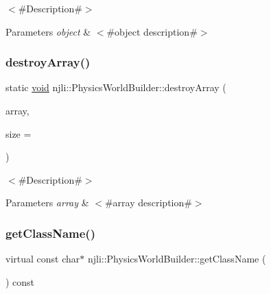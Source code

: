 $<$\#\+Description\#$>$


\begin{DoxyParams}{Parameters}
{\em object} & $<$\#object description\#$>$ \\
\hline
\end{DoxyParams}
\mbox{\label{classnjli_1_1_physics_world_builder_a96ea933d2e5c36b92152c0489f3a707e}} 
\subsubsection{\texorpdfstring{destroy\+Array()}{destroyArray()}}
{\footnotesize\ttfamily static \mbox{\hyperlink{_thread_8h_af1e856da2e658414cb2456cb6f7ebc66}{void}} njli\+::\+Physics\+World\+Builder\+::destroy\+Array (\begin{DoxyParamCaption}\item[{\mbox{\hyperlink{classnjli_1_1_physics_world_builder}{Physics\+World\+Builder}} $\ast$$\ast$}]{array,  }\item[{const \mbox{\hyperlink{_util_8h_a10e94b422ef0c20dcdec20d31a1f5049}{u32}}}]{size = {} }\end{DoxyParamCaption})\hspace{0.3cm}{\ttfamily [static]}}

$<$\#\+Description\#$>$


\begin{DoxyParams}{Parameters}
{\em array} & $<$\#array description\#$>$ \\
\hline
\end{DoxyParams}
\mbox{\label{classnjli_1_1_physics_world_builder_ab046eaf50c425ccf120a4bd6f8702fe0}} 
\subsubsection{\texorpdfstring{get\+Class\+Name()}{getClassName()}}
{\footnotesize\ttfamily virtual const char$\ast$ njli\+::\+Physics\+World\+Builder\+::get\+Class\+Name (\begin{DoxyParamCaption}{ }\end{DoxyParamCaption}) const\hspace{0.3cm}{\ttfamily [virtual]}}

